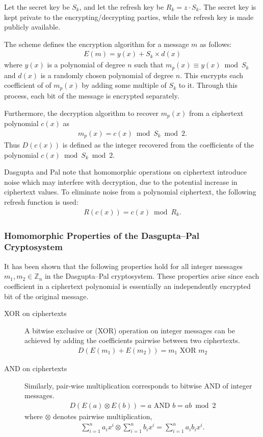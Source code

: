 Let the secret key be $S_k$, and let the refresh key be $R_k = z \cdot S_k$. The secret key is kept private to the encrypting/decrypting parties, while the refresh key is made publicly available.

The scheme defines the encryption algorithm for a message $m$ as follows:
\begin{align*}
	E(m) = y(x) + S_k\times d(x)
\end{align*}
where
$y(x)$ is a polynomial of degree $n$ such that $m_p(x) \equiv y(x) \bmod S_k$ and $d(x)$ is a randomly chosen polynomial of degree $n$. This encrypts each coefficient of of $m_p(x)$ by adding some multiple of $S_k$ to it. Through this process, each bit of the message is encrypted separately.

Furthermore, the decryption algorithm to recover $m_p(x)$ from a ciphertext polynomial $c(x)$ as
\begin{align*}
	m_p(x) = c(x) \bmod S_k \bmod 2.
\end{align*}
Thus $D(c(x))$ is defined as the integer recovered from the coefficients of the polynomial $c(x) \bmod S_k \bmod 2$.

Dasgupta and Pal note that homomorphic operations on ciphertext introduce noise which may interfere with decryption, due to the potential increase in ciphertext values.
To eliminate noise from a polynomial ciphertext, the following refresh function is used:
\begin{align*}
	R(c(x)) = c(x) \bmod R_k.
\end{align*}

\subsubsection{Homomorphic Properties of the Dasgupta--Pal Cryptosystem}
It has been shown \cite{dasgupta_design_2016} that the following properties hold for all integer messages $m_1, m_2 \in \mathbb{Z}_n$ in the Dasgupta--Pal cryptosystem. These properties arise since each coefficient in a ciphertext polynomial is essentially an independently encrypted bit of the original message.
\begin{description}
	\item[XOR on ciphertexts]
	A bitwise exclusive or (XOR) operation on integer messages can be achieved by adding the coefficients pairwise between two ciphertexts.
	\begin{align*}
		D(E(m_1)+E(m_2)) = m_1 \text{ XOR } m_2
	\end{align*}
	\item[AND on ciphertexts]
	Similarly, pair-wise multiplication corresponds to bitwise AND of integer messages.
	\begin{align*}
		D(E(a) \otimes E(b)) = a \text{ AND } b = ab \bmod 2
	\end{align*}
	where $\otimes$ denotes pairwise multiplication,
	\begin{align*}
		\sum_{i=1}^n{a_ix^i} \otimes \sum_{i=1}^n{b_ix^i} = \sum_{i=1}^n{a_ib_ix^i}.
	\end{align*}
\end{description}


